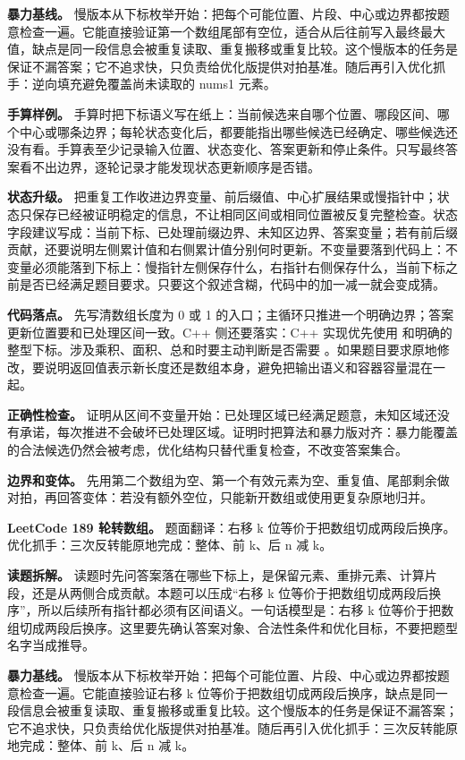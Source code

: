 \textbf{暴力基线。} 慢版本从下标枚举开始：把每个可能位置、片段、中心或边界都按题意检查一遍。它能直接验证第一个数组尾部有空位，适合从后往前写入最终最大值，缺点是同一段信息会被重复读取、重复搬移或重复比较。这个慢版本的任务是保证不漏答案；它不追求快，只负责给优化版提供对拍基准。随后再引入优化抓手：逆向填充避免覆盖尚未读取的 nums1 元素。

\textbf{手算样例。} 手算时把下标语义写在纸上：当前候选来自哪个位置、哪段区间、哪个中心或哪条边界；每轮状态变化后，都要能指出哪些候选已经确定、哪些候选还没有看。手算表至少记录输入位置、状态变化、答案更新和停止条件。只写最终答案看不出边界，逐轮记录才能发现状态更新顺序是否错。

\textbf{状态升级。} 把重复工作收进边界变量、前后缀值、中心扩展结果或慢指针中；状态只保存已经被证明稳定的信息，不让相同区间或相同位置被反复完整检查。状态字段建议写成：当前下标、已处理前缀边界、未知区边界、答案变量；若有前后缀贡献，还要说明左侧累计值和右侧累计值分别何时更新。不变量要落到代码上：不变量必须能落到下标上：慢指针左侧保存什么，右指针右侧保存什么，当前下标之前是否已经满足题目要求。只要这个叙述含糊，代码中的加一减一就会变成猜。

\textbf{代码落点。} 先写清数组长度为 0 或 1 的入口；主循环只推进一个明确边界；答案更新位置要和已处理区间一致。C++ 侧还要落实：C++ 实现优先使用  和明确的整型下标。涉及乘积、面积、总和时要主动判断是否需要 。如果题目要求原地修改，要说明返回值表示新长度还是数组本身，避免把输出语义和容器容量混在一起。

\textbf{正确性检查。} 证明从区间不变量开始：已处理区域已经满足题意，未知区域还没有承诺，每次推进不会破坏已处理区域。证明时把算法和暴力版对齐：暴力能覆盖的合法候选仍然会被考虑，优化结构只替代重复检查，不改变答案集合。

\textbf{边界和变体。} 先用第二个数组为空、第一个有效元素为空、重复值、尾部剩余做对拍，再回答变体：若没有额外空位，只能新开数组或使用更复杂原地归并。

\noindent\textbf{LeetCode 189 轮转数组。} 题面翻译：右移 k 位等价于把数组切成两段后换序。优化抓手：三次反转能原地完成：整体、前 k、后 n 减 k。

\textbf{读题拆解。} 读题时先问答案落在哪些下标上，是保留元素、重排元素、计算片段，还是从两侧合成贡献。本题可以压成“右移 k 位等价于把数组切成两段后换序”，所以后续所有指针都必须有区间语义。一句话模型是：右移 k 位等价于把数组切成两段后换序。这里要先确认答案对象、合法性条件和优化目标，不要把题型名字当成推导。

\textbf{暴力基线。} 慢版本从下标枚举开始：把每个可能位置、片段、中心或边界都按题意检查一遍。它能直接验证右移 k 位等价于把数组切成两段后换序，缺点是同一段信息会被重复读取、重复搬移或重复比较。这个慢版本的任务是保证不漏答案；它不追求快，只负责给优化版提供对拍基准。随后再引入优化抓手：三次反转能原地完成：整体、前 k、后 n 减 k。


